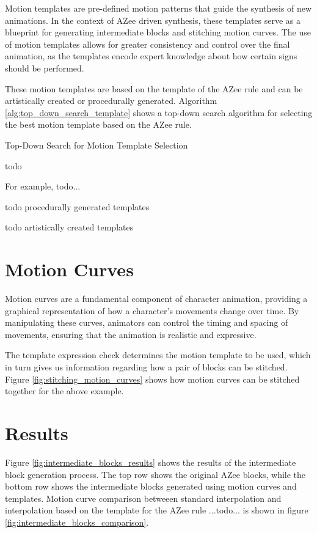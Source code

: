 \documentclass[../../main.tex]{subfiles}
\begin{document}
Motion templates are pre-defined motion patterns that guide the synthesis of new animations. In the context of AZee driven synthesis, these templates serve as a blueprint for generating intermediate blocks and stitching motion curves. The use of motion templates allows for greater consistency and control over the final animation, as the templates encode expert knowledge about how certain signs should be performed.

These motion templates are based on the template of the AZee rule and can be artistically created or procedurally generated. Algorithm \ref{alg:top_down_search_template} shows a top-down search algorithm for selecting the best motion template based on the AZee rule.

\begin{algorithm}
\caption{Top-Down Search for Motion Template Selection}
\label{alg:top_down_search_template}
\begin{algorithmic}
todo
\end{algorithmic}
\end{algorithm}

For example, todo...

todo procedurally generated templates

todo artistically created templates

\section{Motion Curves}
\label{ch:intermediate_blocks:curves}

Motion curves are a fundamental component of character animation, providing a graphical representation of how a character's movements change over time. By manipulating these curves, animators can control the timing and spacing of movements, ensuring that the animation is realistic and expressive. 

The template expression check determines the motion template to be used, which in turn gives us information regarding how a pair of blocks can be stitched. Figure \ref{fig:stitching_motion_curves} shows how motion curves can be stitched together for the above example.

\section{Results}
\label{ch:intermediate_blocks:results}

Figure \ref{fig:intermediate_blocks_results} shows the results of the intermediate block generation process. The top row shows the original AZee blocks, while the bottom row shows the intermediate blocks generated using motion curves and templates. Motion curve comparison betweeen standard interpolation and interpolation based on the template for the AZee rule ...todo... is shown in figure \ref{fig:intermediate_blocks_comparison}.
\end{document}

